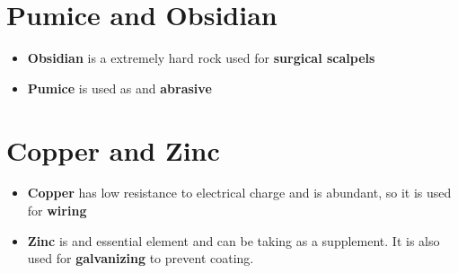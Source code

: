 \documentclass[12pt, letterpaper, twoside]{article}
\begin{document}
\section{Pumice and Obsidian}
	\begin{itemize}
		\item \textbf{Obsidian} is a extremely hard rock used for \textbf{surgical scalpels}
		\item \textbf{Pumice} is used as and \textbf{abrasive}
	\end{itemize}
	
\section{Copper and Zinc}
	\begin{itemize}
		\item \textbf{Copper} has low resistance to electrical charge and is abundant, so it is used for \textbf{wiring}
		\item \textbf{Zinc} is and essential element and can be taking as a supplement. It is also used for \textbf{galvanizing} to prevent coating.
	\end{itemize}
\end{document}

